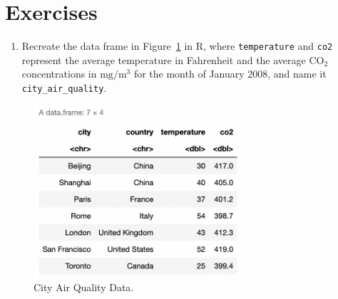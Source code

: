 \documentclass[
  letterpaper,
]{krantz}
\makeatletter
\newenvironment{Shaded}{\begin{snugshade}}{\end{snugshade}}
\newcommand{\CommentTok}[1]{\textcolor[rgb]{0.37,0.37,0.37}{#1}}
\newcommand{\DecValTok}[1]{\textcolor[rgb]{0.68,0.00,0.00}{#1}}
\newcommand{\FunctionTok}[1]{\textcolor[rgb]{0.28,0.35,0.67}{#1}}
\newcommand{\NormalTok}[1]{\textcolor[rgb]{0.00,0.23,0.31}{#1}}
\newcommand{\OtherTok}[1]{\textcolor[rgb]{0.00,0.23,0.31}{#1}}
\newcommand{\SpecialCharTok}[1]{\textcolor[rgb]{0.37,0.37,0.37}{#1}}
\newcommand{\StringTok}[1]{\textcolor[rgb]{0.13,0.47,0.30}{#1}}
\providecommand{\tightlist}{%
  \setlength{\itemsep}{0pt}\setlength{\parskip}{0pt}}\usepackage{longtable,booktabs,array}
\newenvironment{kframe}{%
\medskip{}
\setlength{\fboxsep}{.8em}
 \def\at@end@of@kframe{}%
 \ifinner\ifhmode%
  \def\at@end@of@kframe{\end{minipage}}%
  \begin{minipage}{\columnwidth}%
 \fi\fi%
 \def\FrameCommand##1{\hskip\@totalleftmargin \hskip-\fboxsep
 \colorbox{shadecolor}{##1}\hskip-\fboxsep
     \hskip-\linewidth \hskip-\@totalleftmargin \hskip\columnwidth}%
 \MakeFramed {\advance\hsize-\width
   \@totalleftmargin\z@ \linewidth\hsize
   \@setminipage}}%
 {\par\unskip\endMakeFramed%
 \at@end@of@kframe}
\renewenvironment{Shaded}{\begin{kframe}}{\end{kframe}}
\makeatother
\begin{document}
\begin{Shaded}
\end{Shaded}

\hypertarget{exercises}{%
\section{Exercises}\label{exercises}}

\begin{enumerate}
\def\labelenumi{\arabic{enumi}.}
\tightlist
\item
  Recreate the data frame in Figure~\ref{fig-city-air-quality} in R,
  where \texttt{temperature} and \texttt{co2} represent the average
  temperature in Fahrenheit and the average \(\text{CO}_2\)
  concentrations in \(\text{mg}/\text{m}^3\) for the month of January
  2008, and name it \texttt{city\_air\_quality}.
\end{enumerate}

\begin{figure}

{\centering \includegraphics[width=0.7\textwidth,height=\textheight]{book/images/2-exercise1df.png}

}

\caption{\label{fig-city-air-quality}City Air Quality Data.}

\end{figure}
\end{document}

